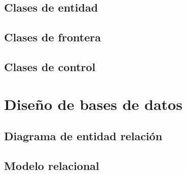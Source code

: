 \subsection{Clases de entidad}

\subsection{Clases de frontera}

\subsection{Clases de control}

\section{Diseño de bases de datos}

\subsection{Diagrama de entidad relación}

\subsection{Modelo relacional}